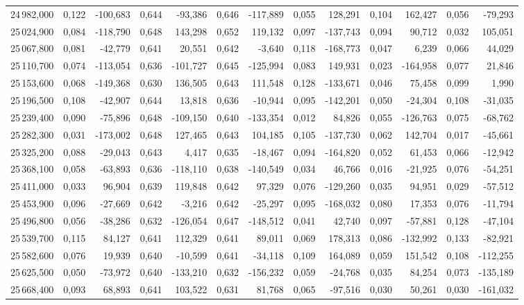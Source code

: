 \begin{longtable}{rrrrrrrrrrrrr}
24\,982,000 & 0,122 & -100,683 & 0,644 & -93,386 & 0,646 & -117,889 & 0,055 & 128,291 & 0,104 & 162,427 & 0,056 & -79,293\\
25\,024,900 & 0,084 & -118,790 & 0,648 & 143,298 & 0,652 & 119,132 & 0,097 & -137,743 & 0,094 & 90,712 & 0,032 & 105,051\\
25\,067,800 & 0,081 & -42,779 & 0,641 & 20,551 & 0,642 & -3,640 & 0,118 & -168,773 & 0,047 & 6,239 & 0,066 & 44,029\\
25\,110,700 & 0,074 & -113,054 & 0,636 & -101,727 & 0,645 & -125,994 & 0,083 & 149,931 & 0,023 & -164,958 & 0,077 & 21,846\\
25\,153,600 & 0,068 & -149,368 & 0,630 & 136,505 & 0,643 & 111,548 & 0,128 & -133,671 & 0,046 & 75,458 & 0,099 & 1,990\\
25\,196,500 & 0,108 & -42,907 & 0,644 & 13,818 & 0,636 & -10,944 & 0,095 & -142,201 & 0,050 & -24,304 & 0,108 & -31,035\\
25\,239,400 & 0,090 & -75,896 & 0,648 & -109,150 & 0,640 & -133,354 & 0,012 & 84,826 & 0,055 & -126,763 & 0,075 & -68,762\\
25\,282,300 & 0,031 & -173,002 & 0,648 & 127,465 & 0,643 & 104,185 & 0,105 & -137,730 & 0,062 & 142,704 & 0,017 & -45,661\\
25\,325,200 & 0,088 & -29,043 & 0,643 & 4,417 & 0,635 & -18,467 & 0,094 & -164,820 & 0,052 & 61,453 & 0,066 & -12,942\\
25\,368,100 & 0,058 & -63,893 & 0,636 & -118,110 & 0,638 & -140,549 & 0,034 & 46,766 & 0,016 & -21,925 & 0,076 & -54,251\\
25\,411,000 & 0,033 & 96,904 & 0,639 & 119,848 & 0,642 & 97,329 & 0,076 & -129,260 & 0,035 & 94,951 & 0,029 & -57,512\\
25\,453,900 & 0,096 & -27,669 & 0,642 & -3,216 & 0,642 & -25,297 & 0,095 & -168,032 & 0,080 & 17,353 & 0,076 & -11,794\\
25\,496,800 & 0,056 & -38,286 & 0,632 & -126,054 & 0,647 & -148,512 & 0,041 & 42,740 & 0,097 & -57,881 & 0,128 & -47,104\\
25\,539,700 & 0,115 & 84,127 & 0,641 & 112,329 & 0,641 & 89,011 & 0,069 & 178,313 & 0,086 & -132,992 & 0,133 & -82,921\\
25\,582,600 & 0,076 & 19,939 & 0,640 & -10,599 & 0,641 & -34,118 & 0,109 & 164,089 & 0,059 & 151,542 & 0,108 & -112,255\\
25\,625,500 & 0,050 & -73,972 & 0,640 & -133,210 & 0,632 & -156,232 & 0,059 & -24,768 & 0,035 & 84,254 & 0,073 & -135,189\\
25\,668,400 & 0,093 & 68,893 & 0,641 & 103,522 & 0,631 & 81,768 & 0,065 & -97,516 & 0,030 & 50,261 & 0,030 & -161,032\\

\end{longtable}
